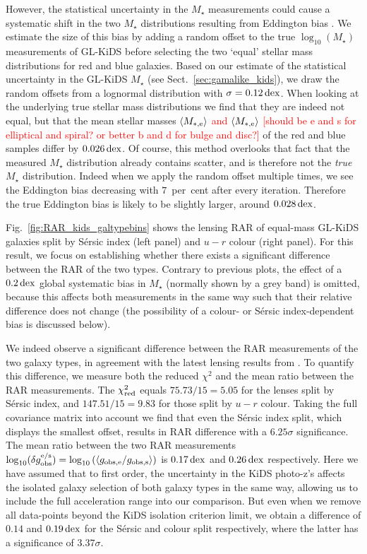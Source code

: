 \documentclass[usenatbib]{mnras}
\newcommand{\lan}{\langle}
\newcommand{\ran}{\rangle}
\newcommand{\un}[1]{_{\rm #1}}
\newcommand{\dex}{\, {\rm dex}}
\begin{document}
However, the statistical uncertainty in the $M_\star$ measurements could cause a systematic shift in the two $M_\star$ distributions resulting from Eddington bias \cite[]{eddington1913}. We estimate the size of this bias by adding a random offset to the true $\log_{10}(M_\star)$ measurements of GL-KiDS before selecting the two `equal' stellar mass distributions for red and blue galaxies. Based on our estimate of the statistical uncertainty in the GL-KiDS $M_\star$ (see Sect.~\ref{sec:gamalike_kids}), we draw the random offsets from a lognormal distribution with $\sigma = 0.12 \dex$. When looking at the underlying true stellar mass distributions we find that they are indeed not equal, but that the mean stellar masses \textcolor{red}{$\lan M\un{*,e} \ran$ and $\lan M\un{*,e} \ran$ [should be e and s for elliptical and spiral? or better b and d for bulge and disc?]} of the red and blue samples differ by $0.026 \dex$. Of course, this method overlooks that fact that the measured $M_\star$ distribution already contains scatter, and is therefore not the \emph{true} $M_\star$ distribution. Indeed when we apply the random offset multiple times, we see the Eddington bias decreasing with $7$~per~cent after every iteration. Therefore the true Eddington bias is likely to be slightly larger, around $0.028 \dex$.

Fig.~\ref{fig:RAR_kids_galtypebins} shows the lensing RAR of equal-mass GL-KiDS galaxies split by S\'ersic index (left panel) and $u-r$ colour (right panel). For this result, we focus on establishing whether there exists a significant difference between the RAR of the two types. Contrary to previous plots, the effect of a $0.2 \dex$ global systematic bias in $M_\star$ (normally shown by a grey band) is omitted, because this affects both measurements in the same way such that their relative difference does not change (the possibility of a colour- or S\'ersic index-dependent bias is discussed below).

We indeed observe a significant difference between the RAR measurements of the two galaxy types, in agreement with the latest lensing results from \cite{taylor2020}. To quantify this difference, we measure both the reduced $\chi^2$ and the mean ratio between the RAR measurements. The $\chi\un{red}^2$ equals $75.73 / 15 = 5.05$ for the lenses split by S\'ersic index, and $147.51 / 15 = 9.83$ for those split by $u-r$ colour. Taking the full covariance matrix into account we find that even the S\'ersic index split, which displays the smallest offset, results in RAR difference with a $6.25 \sigma$ significance. The mean ratio between the two RAR measurements $\log_{10}(\delta g\un{obs}^{\rm e/s}) = \log_{10}\left( \langle g\un{obs,e} / g\un{obs,s}\rangle \right)$ is $0.17 \dex$ and $0.26 \dex$ respectively. Here we have assumed that to first order, the uncertainty in the KiDS photo-z's affects the isolated galaxy selection of both galaxy types in the same way, allowing us to include the full acceleration range into our comparison. But even when we remove all data-points beyond the KiDS isolation criterion limit, we obtain a difference of $0.14$ and $0.19 \dex$ for the S\'ersic and colour split respectively, where the latter has a significance of $3.37 \sigma$.
\end{document}

